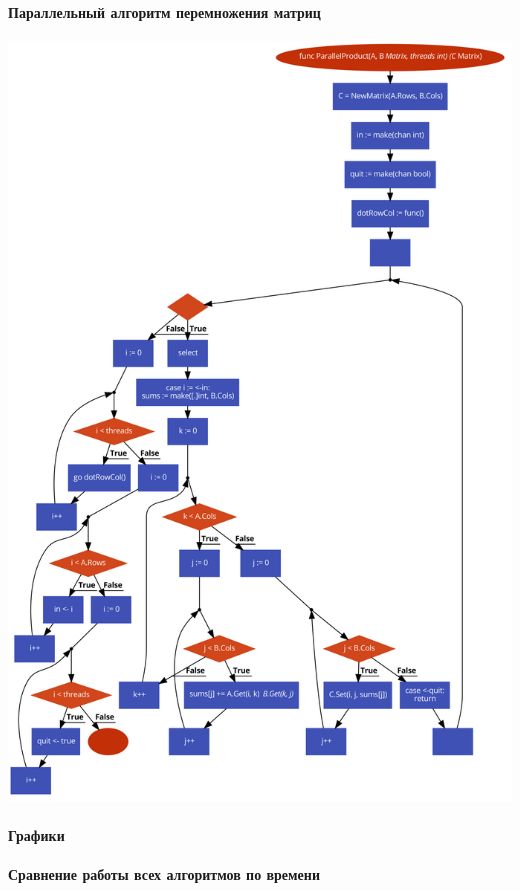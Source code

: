 \documentclass[utf8x, 12pt]{G7-32} %
\begin{document}
\paragraph{Параллельный алгоритм перемножения матриц}
\begin{center}
	\includegraphics[scale=0.28]{images/matrixParallel.png}
\end{center}

\newpage

\paragraph{Графики}

\begin{flushleft}
	\paragraph{Сравнение работы всех алгоритмов по времени}
\end{flushleft}
\end{document}
